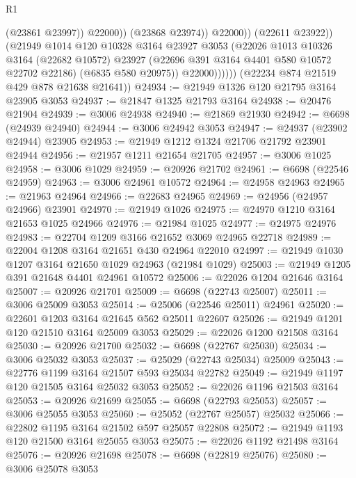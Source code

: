 \begin{lexlean}{R1}
\begin{coremodule}
                              (@23861 @23997))
                            @22000))
                        (@23868 @23974))
                      @22000))
                  (@22611 @23922))
                (@21949
                  @1014
                  @120
                  @10328
                  @3164
                  @23927
                  @3053
                  (@22026
                    @1013
                    @10326
                    @3164
                    (@22682 @10572)
                    @23927
                    (@22696 @391 @3164 @4401 @580 @10572 @22702 @22186)
                    (@6835 @580 @20975))
                  @22000))))))
      (@22234 @874 @21519 @429 @878 @21638 @21641))
@24934 := @21949 @1326 @120 @21795 @3164 @23905 @3053
@24937 := @21847 @1325 @21793 @3164
@24938 := @20476 @21904
@24939 := @3006 @24938
@24940 := @21869 @21930
@24942 := @6698 (@24939 @24940)
@24944 := @3006 @24942 @3053
@24947 := @24937 (@23902 @24944) @23905
@24953 := @21949 @1212 @1324 @21706 @21792 @23901 @24944
@24956 := @21957 @1211 @21654 @21705
@24957 := @3006 @1025
@24958 := @3006 @1029
@24959 := @20926 @21702
@24961 := @6698 (@22546 @24959)
@24963 := @3006 @24961 @10572
@24964 := @24958 @24963
@24965 := @21963 @24964
@24966 := @22683 @24965
@24969 := @24956 (@24957 @24966) @23901
@24970 := @21949 @1026
@24975 := @24970 @1210 @3164 @21653 @1025 @24966
@24976 := @21984 @1025
@24977 := @24975 @24976
@24983 := @22704 @1209 @3166 @21652 @3069 @24965 @22718
@24989 := @22004 @1208 @3164 @21651 @430 @24964 @22010
@24997 := @21949 @1030 @1207 @3164 @21650 @1029 @24963 (@21984 @1029)
@25003 := @21949 @1205 @391 @21648 @4401 @24961 @10572
@25006 := @22026 @1204 @21646 @3164
@25007 := @20926 @21701
@25009 := @6698 (@22743 @25007)
@25011 := @3006 @25009 @3053
@25014 := @25006 (@22546 @25011) @24961
@25020 := @22601 @1203 @3164 @21645 @562 @25011 @22607
@25026 := @21949 @1201 @120 @21510 @3164 @25009 @3053
@25029 := @22026 @1200 @21508 @3164
@25030 := @20926 @21700
@25032 := @6698 (@22767 @25030)
@25034 := @3006 @25032 @3053
@25037 := @25029 (@22743 @25034) @25009
@25043 := @22776 @1199 @3164 @21507 @593 @25034 @22782
@25049 := @21949 @1197 @120 @21505 @3164 @25032 @3053
@25052 := @22026 @1196 @21503 @3164
@25053 := @20926 @21699
@25055 := @6698 (@22793 @25053)
@25057 := @3006 @25055 @3053
@25060 := @25052 (@22767 @25057) @25032
@25066 := @22802 @1195 @3164 @21502 @597 @25057 @22808
@25072 := @21949 @1193 @120 @21500 @3164 @25055 @3053
@25075 := @22026 @1192 @21498 @3164
@25076 := @20926 @21698
@25078 := @6698 (@22819 @25076)
@25080 := @3006 @25078 @3053

\end{coremodule}
\end{lexlean}
